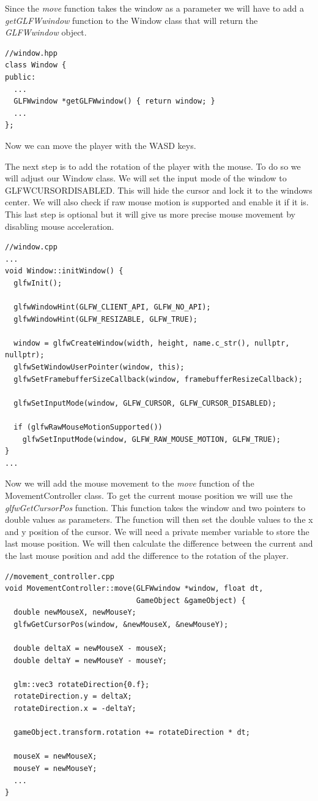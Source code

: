 \documentclass[12pt]{report} \usepackage{preamble}
\begin{document}
Since the \textit{move} function takes the window as a parameter we will have to add a \textit{getGLFWwindow} function to the Window class that will return the \textit{GLFWwindow} object.

\begin{lstlisting}[Language=C++]
//window.hpp
class Window {
public:
  ...
  GLFWwindow *getGLFWwindow() { return window; }
  ...
};
\end{lstlisting}

Now we can move the player with the WASD keys.

The next step is to add the rotation of the player with the mouse.
To do so we will adjust our Window class. We will set the input mode of the window to GLFW\textunderscore CURSOR\textunderscore DISABLED.
This will hide the cursor and lock it to the windows center. We will also check if raw mouse motion is supported and enable it if it is.
This last step is optional but it will give us more precise mouse movement by disabling mouse acceleration.

\begin{lstlisting}[Language=C++]
//window.cpp
...
void Window::initWindow() {
  glfwInit();

  glfwWindowHint(GLFW_CLIENT_API, GLFW_NO_API);
  glfwWindowHint(GLFW_RESIZABLE, GLFW_TRUE);

  window = glfwCreateWindow(width, height, name.c_str(), nullptr, nullptr);
  glfwSetWindowUserPointer(window, this);
  glfwSetFramebufferSizeCallback(window, framebufferResizeCallback);

  glfwSetInputMode(window, GLFW_CURSOR, GLFW_CURSOR_DISABLED);

  if (glfwRawMouseMotionSupported())
    glfwSetInputMode(window, GLFW_RAW_MOUSE_MOTION, GLFW_TRUE);
}
...
\end{lstlisting}

Now we will add the mouse movement to the \textit{move} function of the MovementController class.
To get the current mouse position we will use the \textit{glfwGetCursorPos} function. This function
takes the window and two pointers to double values as parameters. The function will then set the double values to the x and y position of the cursor.
We will need a private member variable to store the last mouse position. We will then calculate the difference between the current and the last mouse position
and add the difference to the rotation of the player.

\begin{lstlisting}[Language=C++]
//movement_controller.cpp
void MovementController::move(GLFWwindow *window, float dt,
                              GameObject &gameObject) {
  double newMouseX, newMouseY;
  glfwGetCursorPos(window, &newMouseX, &newMouseY);

  double deltaX = newMouseX - mouseX;
  double deltaY = newMouseY - mouseY;

  glm::vec3 rotateDirection{0.f};
  rotateDirection.y = deltaX;
  rotateDirection.x = -deltaY;

  gameObject.transform.rotation += rotateDirection * dt;

  mouseX = newMouseX;
  mouseY = newMouseY;
  ...
}
\end{lstlisting}
\end{document}

